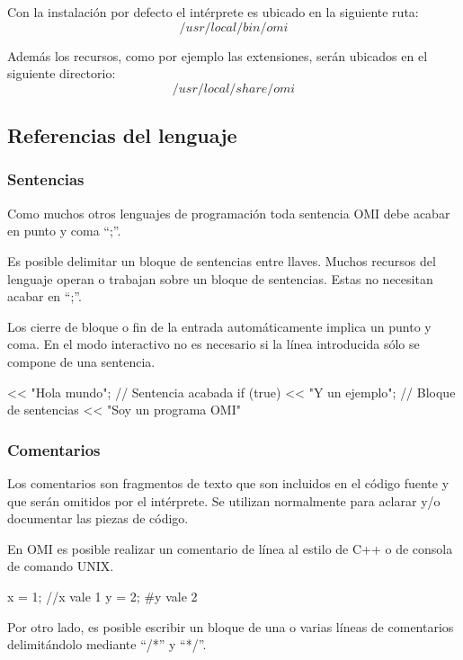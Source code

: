 Con la instalación por defecto el intérprete es ubicado en la siguiente ruta:
$$/usr/local/bin/omi$$

Además los recursos, como por ejemplo las extensiones, serán ubicados en el siguiente directorio:
$$/usr/local/share/omi$$

\lstset {language=omi}
\subsection{Referencias del lenguaje}
\subsubsection{Sentencias} \label{sec:stmt}
Como muchos otros lenguajes de programación toda sentencia OMI debe acabar en punto y coma ``;''. 

Es posible delimitar un bloque de sentencias entre llaves. Muchos recursos del lenguaje operan 
 o trabajan sobre un bloque de sentencias. Estas no necesitan acabar en ``;''.

Los cierre de bloque o fin de la entrada automáticamente implica un punto y coma.
En el modo interactivo no es necesario si la línea introducida sólo se compone de una sentencia. \\

\begin{myverbatim}
   << "Hola mundo"; // Sentencia acabada 
   if (true) { << "Y un ejemplo"; } // Bloque de sentencias 
   << "Soy un programa OMI"
\end{myverbatim}

\subsubsection{Comentarios}\label{sec:comments}
Los comentarios son fragmentos de texto que son incluidos en el código fuente y que serán omitidos por el intérprete. Se utilizan normalmente para aclarar y/o documentar las
piezas de código. 

En OMI es posible realizar un comentario de línea al estilo de C++ o de consola de comando UNIX. \\

\begin{myverbatim}
   x = 1; //x vale 1
   y = 2; #y vale 2
\end{myverbatim}
 
Por otro lado, es posible escribir un bloque de una o varias líneas de comentarios delimitándolo mediante ``/*'' y ``*/''. \\


